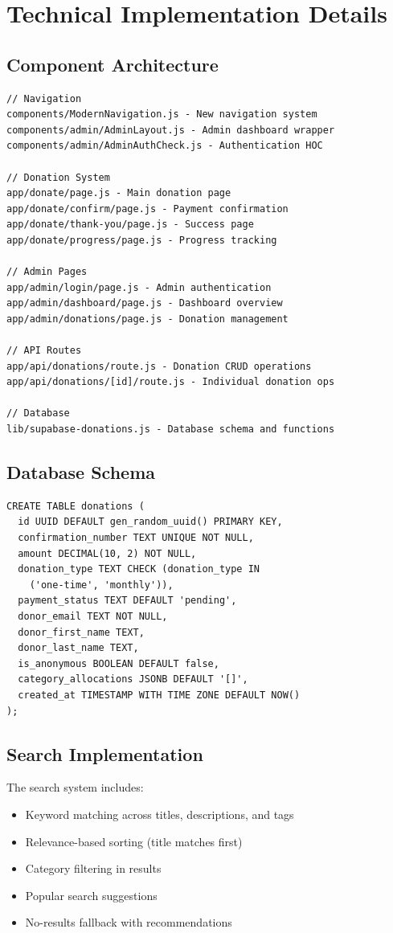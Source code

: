 \documentclass[11pt,a4paper]{article}
\begin{document}
\section{Technical Implementation Details}

\subsection{Component Architecture}
\begin{lstlisting}[caption=Key Components Created]
// Navigation
components/ModernNavigation.js - New navigation system
components/admin/AdminLayout.js - Admin dashboard wrapper
components/admin/AdminAuthCheck.js - Authentication HOC

// Donation System
app/donate/page.js - Main donation page
app/donate/confirm/page.js - Payment confirmation
app/donate/thank-you/page.js - Success page
app/donate/progress/page.js - Progress tracking

// Admin Pages
app/admin/login/page.js - Admin authentication
app/admin/dashboard/page.js - Dashboard overview
app/admin/donations/page.js - Donation management

// API Routes
app/api/donations/route.js - Donation CRUD operations
app/api/donations/[id]/route.js - Individual donation ops

// Database
lib/supabase-donations.js - Database schema and functions
\end{lstlisting}

\subsection{Database Schema}
\begin{lstlisting}[caption=Donations Table Structure]
CREATE TABLE donations (
  id UUID DEFAULT gen_random_uuid() PRIMARY KEY,
  confirmation_number TEXT UNIQUE NOT NULL,
  amount DECIMAL(10, 2) NOT NULL,
  donation_type TEXT CHECK (donation_type IN 
    ('one-time', 'monthly')),
  payment_status TEXT DEFAULT 'pending',
  donor_email TEXT NOT NULL,
  donor_first_name TEXT,
  donor_last_name TEXT,
  is_anonymous BOOLEAN DEFAULT false,
  category_allocations JSONB DEFAULT '[]',
  created_at TIMESTAMP WITH TIME ZONE DEFAULT NOW()
);
\end{lstlisting}

\subsection{Search Implementation}
The search system includes:
\begin{itemize}[leftmargin=*,itemsep=3pt]
    \item Keyword matching across titles, descriptions, and tags
    \item Relevance-based sorting (title matches first)
    \item Category filtering in results
    \item Popular search suggestions
    \item No-results fallback with recommendations
\end{itemize}
\end{document}
